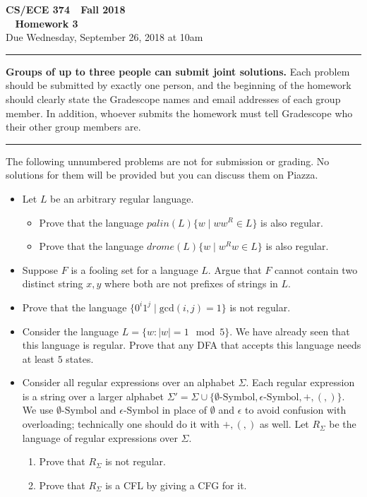 \documentclass[11pt]{article}
\begin{document}

\thispagestyle{empty}

\begin{center}
\Large\textbf{CS/ECE 374 \,\decosix\,  Fall 2018}%
\\
\LARGE\textbf{\decothreeleft~ Homework 3 ~\decothreeright}%
\\[0.5ex]
\large Due Wednesday, September 26, 2018 at 10am
\end{center}

\bigskip
\hrule
\bigskip

\noindent
\textbf{Groups of up to three people can submit joint solutions.}
Each problem should be submitted by exactly one person, and the
beginning of the homework should clearly state the Gradescope names
and email addresses of each group member.  In addition, whoever
submits the homework must tell Gradescope who their other group
members are.
\bigskip \hrule \bigskip


\noindent
The following unnumbered problems are not for submission or grading.
No solutions for them will be provided but you can discuss them on Piazza.
\begin{itemize}
\item Let $L$ be an arbitrary regular language.
  \begin{itemize}
  \item Prove that the language $palin(L) \{w \mid ww^R \in L\}$ is
    also regular.
  \item  Prove that the language $drome(L) \{w \mid w^Rw \in
    L\}$ is also regular.
  \end{itemize}

\item Suppose $F$ is a fooling set for a language $L$. Argue that
$F$ cannot contain two distinct string $x,y$ where both
are not prefixes of strings in $L$.

\item Prove that the language $\{0^i1^j \mid \text{gcd}(i,j) = 1\}$ is
  not regular.
\item Consider the language $L = \{w : |w| = 1 \mod 5\}$. We have already
  seen that this language is regular. Prove that any DFA that accepts this
  language needs at least $5$ states.

\item Consider all regular expressions over an alphabet $\Sigma$. Each
  regular expression is a string over a larger alphabet $\Sigma' =
  \Sigma \cup \{
  \emptyset\text{-Symbol},\epsilon\text{-Symbol},+,(,)\}$.  We use
  $\emptyset\text{-Symbol}$ and $\epsilon\text{-Symbol}$ in place of
  $\emptyset$ and $\epsilon$ to avoid confusion with overloading; technically
  one should do it with $+,(,)$ as well.  Let $R_\Sigma$ be
  the language of regular expressions over $\Sigma$.
  \begin{enumerate}
  \item Prove that $R_\Sigma$ is not regular.
  \item Prove that $R_\Sigma$ is a CFL by giving a CFG for it.
  \end{enumerate}

\end{itemize}
\end{document}
